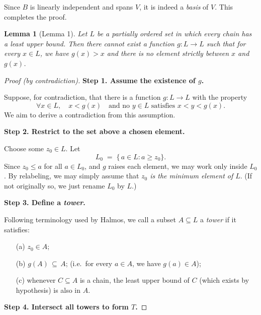 \documentclass[12pt]{article}
\theoremstyle{definition} %
\newtheorem{lemma}{Lemma}
\theoremstyle{plain} %
\begin{document}
\medskip
\noindent
Since $B$ is linearly independent and spans $V$, it is indeed a \emph{basis} of $V$. This completes the proof.

\begin{lemma}[Lemma 1]
    \label{lemma:1}
    \textit{Let $L$ be a partially ordered set in which every chain has a 
    least upper bound.  Then there cannot exist a function 
    $g : L \to L$ such that for every $x \in L$, we have $g(x) > x$ 
    \emph{and} there is no element strictly between $x$ and $g(x)$.}
    \end{lemma}
    
    \begin{proof}[Proof (by contradiction)]
    \textbf{Step 1. Assume the existence of $g$.}
    
    Suppose, for contradiction, that there is a function 
    $g : L \to L$ with the property
    \[
       \forall x \in L,\quad x < g(x)
       \quad\text{and no $y \in L$ satisfies } x < y < g(x).
    \]
    We aim to derive a contradiction from this assumption.
    
    \medskip
    
    \textbf{Step 2. Restrict to the set above a chosen element.}
    
    Choose some $z_0 \in L$.  Let
    \[
       L_0 \;=\; \{\,a \in L : a \ge z_0\}.
    \]
    Since $z_0 \le a$ for all $a \in L_0$, and $g$ raises each element, 
    we may work only inside $L_0$.  By relabeling, we may simply assume 
    that \emph{$z_0$ is the minimum element of $L$}.  (If not originally so, 
    we just rename $L_0$ by $L$.)
    
    \medskip
    
    \textbf{Step 3. Define a \emph{tower}.}
    
    Following terminology used by Halmos, we call a subset 
    $A \subseteq L$ a \emph{tower} if it satisfies:
    \begin{itemize}
    \item[(a)] $z_0 \in A$;
    \item[(b)] $g(A) \,\subseteq\, A$;  (i.e.\ for every $a \in A$, we have $g(a) \in A$);
    \item[(c)] whenever $C \subseteq A$ is a chain, the least upper bound of 
       $C$ (which exists by hypothesis) is also in $A$.
    \end{itemize}
    
    \medskip
    
    \textbf{Step 4. Intersect all towers to form $T$.}
    

\end{proof}
\end{document}
